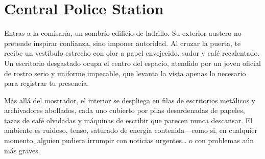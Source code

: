 \section{Central Police Station} 

Entras a la comisaría, un sombrío edificio de ladrillo. Su exterior austero no
pretende inspirar confianza, sino imponer autoridad. Al cruzar la puerta, te
recibe un vestíbulo estrecho con olor a papel envejecido, sudor y café
recalentado. Un escritorio desgastado ocupa el centro del espacio, atendido por
un joven oficial de rostro serio y uniforme impecable, que levanta la vista
apenas lo necesario para registrar tu presencia.

Más allá del mostrador, el interior se despliega en filas de escritorios
metálicos y archivadores abollados, cada uno cubierto por pilas desordenadas de
papeles, tazas de café olvidadas y máquinas de escribir que parecen nunca
descansar. El ambiente es ruidoso, tenso, saturado de energía contenida—como
si, en cualquier momento, alguien pudiera irrumpir con noticias urgentes… o con
problemas aún más graves.
